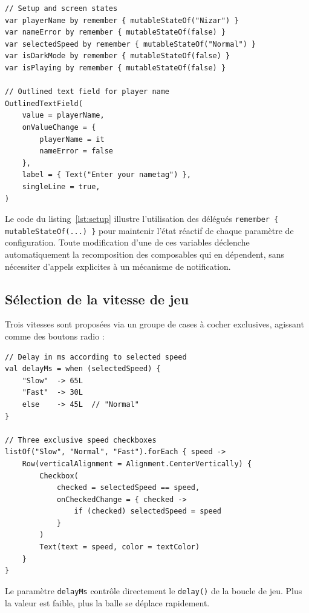 \documentclass[12pt,a4paper]{report}
\begin{document}
\begin{lstlisting}[caption={Gestion de l'\'etat de configuration et champ de saisie du pseudonyme}, label=lst:setup]
// Setup and screen states
var playerName by remember { mutableStateOf("Nizar") }
var nameError by remember { mutableStateOf(false) }
var selectedSpeed by remember { mutableStateOf("Normal") }
var isDarkMode by remember { mutableStateOf(false) }
var isPlaying by remember { mutableStateOf(false) }

// Outlined text field for player name
OutlinedTextField(
    value = playerName,
    onValueChange = {
        playerName = it
        nameError = false
    },
    label = { Text("Enter your nametag") },
    singleLine = true,
)
\end{lstlisting}

Le code du listing~\ref{lst:setup} illustre l'utilisation des d\'el\'egu\'es \texttt{remember \{ mutableStateOf(...) \}} pour maintenir l'\'etat r\'eactif de chaque param\`etre de configuration. Toute modification d'une de ces variables d\'eclenche automatiquement la recomposition des composables qui en d\'ependent, sans n\'ecessiter d'appels explicites \`a un m\'ecanisme de notification.

\subsection{S\'election de la vitesse de jeu}
Trois vitesses sont propos\'ees via un groupe de cases \`a cocher exclusives, agissant comme des boutons radio :

\begin{lstlisting}[caption={S\'election de la vitesse avec Checkboxes exclusives}, label=lst:speed]
// Delay in ms according to selected speed
val delayMs = when (selectedSpeed) {
    "Slow"  -> 65L
    "Fast"  -> 30L
    else    -> 45L  // "Normal"
}

// Three exclusive speed checkboxes
listOf("Slow", "Normal", "Fast").forEach { speed ->
    Row(verticalAlignment = Alignment.CenterVertically) {
        Checkbox(
            checked = selectedSpeed == speed,
            onCheckedChange = { checked ->
                if (checked) selectedSpeed = speed
            }
        )
        Text(text = speed, color = textColor)
    }
}
\end{lstlisting}

Le param\`etre \texttt{delayMs} contr\^ole directement le \texttt{delay()} de la boucle de jeu. Plus la valeur est faible, plus la balle se d\'eplace rapidement.
\end{document}
